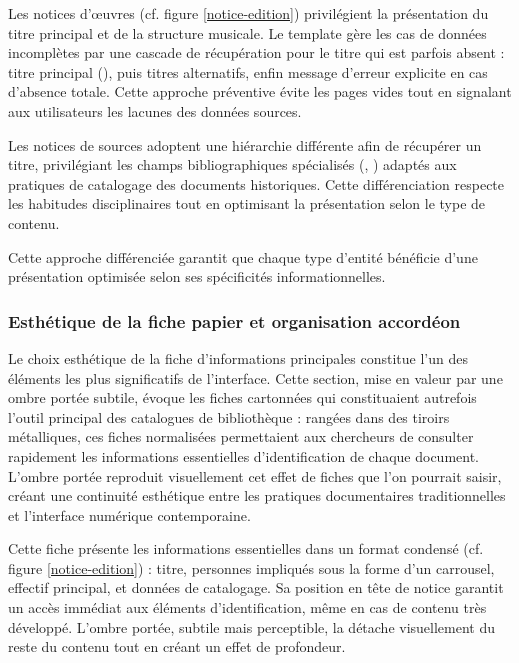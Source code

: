 Les notices d'œuvres (cf. figure \ref{notice-edition}) privilégient la présentation du titre principal et de la structure musicale. Le template  gère les cas de données incomplètes par une cascade de récupération pour le titre qui est parfois absent : titre principal (), puis titres alternatifs, enfin message d'erreur explicite en cas d'absence totale. Cette approche préventive évite les pages vides tout en signalant aux utilisateurs les lacunes des données sources.

Les notices de sources adoptent une hiérarchie différente afin de récupérer un titre, privilégiant les champs bibliographiques spécialisés (, ) adaptés aux pratiques de catalogage des documents historiques. Cette différenciation respecte les habitudes disciplinaires tout en optimisant la présentation selon le type de contenu.

Cette approche différenciée garantit que chaque type d'entité bénéficie d'une présentation optimisée selon ses spécificités informationnelles.

\subsubsection{Esthétique de la fiche papier et organisation accordéon}

Le choix esthétique de la fiche d'informations principales constitue l'un des éléments les plus significatifs de l'interface. Cette section, mise en valeur par une ombre portée subtile, évoque les fiches cartonnées qui constituaient autrefois l'outil principal des catalogues de bibliothèque : rangées dans des tiroirs métalliques, ces fiches normalisées permettaient aux chercheurs de consulter rapidement les informations essentielles d'identification de chaque document. L'ombre portée reproduit visuellement cet effet de fiches que l'on pourrait saisir, créant une continuité esthétique entre les pratiques documentaires traditionnelles et l'interface numérique contemporaine.

Cette fiche présente les informations essentielles dans un format condensé (cf. figure \ref{notice-edition}) : titre, personnes impliqués sous la forme d'un carrousel, effectif principal, et données de catalogage. Sa position en tête de notice garantit un accès immédiat aux éléments d'identification, même en cas de contenu très développé. L'ombre portée, subtile mais perceptible, la détache visuellement du reste du contenu tout en créant un effet de profondeur.

